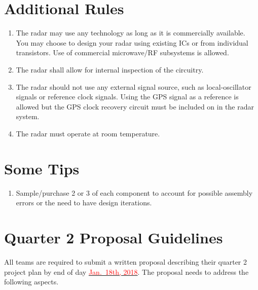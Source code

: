 \documentclass[letterpaper, 11pt]{article}
\newcommand{\due}[1]{\href{https://github.com/ucdart/UCD-EEC134/blob/master/support/schedule/eec134-schedule.pdf}{\textcolor{red}{#1}}}
\begin{document}
%	
%

\section{Additional Rules}
	\begin{enumerate}[itemsep=-0.1ex]
		
		\item The radar may use any technology as long as it is commercially available. You may choose to design your radar using existing ICs or from individual transistors. Use of commercial microwave/RF subsystems is allowed.
		
		\item The radar shall allow for internal inspection of the circuitry.
		
		\item The radar should not use any external signal source, such as local-oscillator signals or reference clock signals. Using the GPS signal as a reference is allowed but the GPS clock recovery circuit must be included on in the radar system.
		
		\item The radar must operate at room temperature. 		
	\end{enumerate}

\section{Some Tips}
\begin{enumerate}
	\item Sample/purchase 2 or 3 of each component to account for possible assembly errors or the need to have design iterations. 
\end{enumerate}

\section{Quarter 2 Proposal Guidelines}

All teams are required to submit a written proposal describing their quarter 2 project plan by end of day \due{Jan.~18th, 2018}. The proposal needs to address the following aspects.
\end{document}

